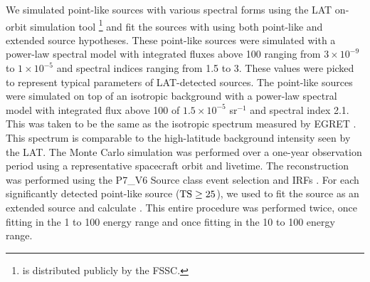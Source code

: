 We simulated point-like sources with various spectral forms using
the LAT on-orbit simulation tool
\gtobssim\footnote{\gtobssim is distributed publicly by the FSSC.} and fit the sources
with \pointlike using both point-like
and extended source hypotheses.  These point-like sources were simulated with a power-law
spectral model with integrated fluxes above 100 \mev ranging from $3\times10^{-9}$ 
to $1\times10^{-5}$ \fluxunits and spectral
indices ranging from 1.5 to 3.  These values
were picked to represent typical parameters of LAT-detected
sources. The point-like sources were simulated on top of an isotropic
background with a power-law spectral model with
integrated flux above 100 \mev of $1.5\times10^{-5}$ \fluxunits sr$^{-1}$
and spectral index 2.1.
This was
taken to be the same as the isotropic spectrum measured by EGRET
\citep{sreekumar_1998a_egret-observations}.  This spectrum is comparable
to the high-latitude background intensity seen by the LAT.
The Monte Carlo simulation was performed
over a one-year observation period using a representative 
spacecraft orbit and livetime.
The reconstruction was performed
using the P7\_V6 Source class event selection and IRFs \citep{ackermann_2012a_fermi-large}. For each 
significantly detected point-like source ($\mathrm{TS}\ge25$), we used \pointlike
to fit the source as an extended source and calculate \tsext.
This entire procedure was performed twice, once fitting in the 1 \gev
to 100 \gev energy range and once fitting in the 10 \gev to 100 \gev
energy range.


